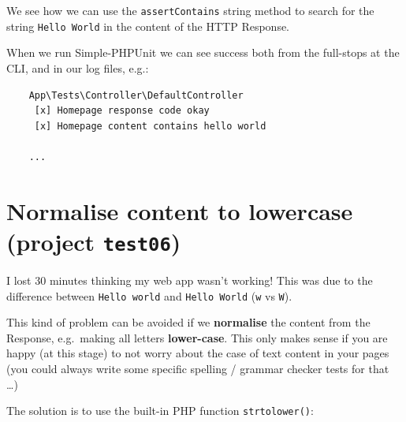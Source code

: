 \documentclass[a4paperpaper,openright]{book}
\begin{document}
We see how we can use the \texttt{assertContains} string method to
search for the string \texttt{Hello\ World} in the content of the HTTP
Response.

When we run Simple-PHPUnit we can see success both from the full-stops
at the CLI, and in our log files, e.g.:

\begin{verbatim}
    App\Tests\Controller\DefaultController
     [x] Homepage response code okay
     [x] Homepage content contains hello world

    ...
\end{verbatim}

\hypertarget{normalise-content-to-lowercase-project-test06}{%
\section{\texorpdfstring{Normalise content to lowercase (project
\texttt{test06})}{Normalise content to lowercase (project test06)}}\label{normalise-content-to-lowercase-project-test06}}

I lost 30 minutes thinking my web app wasn't working! This was due to
the difference between \texttt{Hello\ world} and \texttt{Hello\ World}
(\texttt{w} vs \texttt{W}).

This kind of problem can be avoided if we \textbf{normalise} the content
from the Response, e.g.~making all letters \textbf{lower-case}. This
only makes sense if you are happy (at this stage) to not worry about the
case of text content in your pages (you could always write some specific
spelling / grammar checker tests for that \ldots{})

The solution is to use the built-in PHP function \texttt{strtolower()}:
\end{document}
